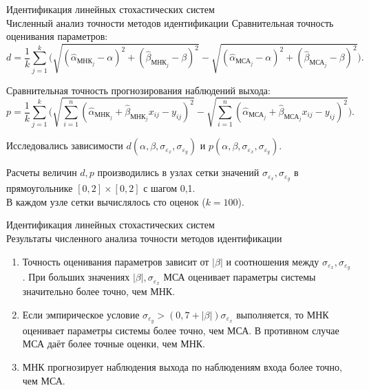 \documentclass[hyperref={pdftex,unicode}]{beamer}
\begin{document}
\begin{frame}{%
    Идентификация линейных стохастических систем \\
    \small{Численный анализ точности методов идентификации}
  }
  Сравнительная точность оценивания параметров:
  \small{
    \begin{equation*}
      d =
      \frac{1}{k} \sum_{j=1}^k
      \Bigg(
      \sqrt{(\hat{\alpha}_{\text{МНК}_j} - \alpha)^2 + (\hat{\beta}_{\text{МНК}_j} - \beta)^2} -
      \sqrt{(\hat{\alpha}_{\text{МСА}_j} - \alpha)^2 + (\hat{\beta}_{\text{МСА}_j} - \beta)^2}
      \Bigg).
    \end{equation*}
  }

  Сравнительная точность прогнозирования наблюдений выхода:
  \small{
    \begin{equation*}
      p =
      \frac{1}{k} \sum_{j=1}^k
      \Bigg(
      \sqrt{ \sum_{i=1}^n (\hat{\alpha}_{\text{МНК}_j} + \hat{\beta}_{\text{МНК}_j} x_{ij} - y_{ij})^2} -
      \sqrt{ \sum_{i=1}^n (\hat{\alpha}_{\text{МСА}_j} + \hat{\beta}_{\text{МСА}_j} x_{ij} - y_{ij})^2}
      \Bigg).
    \end{equation*}
  }

  Исследовались зависимости
  \( d(\alpha, \beta, \sigma_{\varepsilon_x}, \sigma_{\varepsilon_y}) \) и
  \( p(\alpha, \beta, \sigma_{\varepsilon_x}, \sigma_{\varepsilon_y}) \).

\bigskip
\scriptsize{%
  Расчеты величин \( d, p \) производились в узлах сетки значений
  \( \sigma_{\varepsilon_x}, \sigma_{\varepsilon_y} \) в прямоугольнике
  \( [0, 2] \times [0, 2] \) с шагом 0{,}1. \\
  В каждом узле сетки вычислялось сто оценок (\( k = 100 \)).
}
\end{frame}

\begin{frame}{Идентификация линейных стохастических систем \\
    \small{Результаты численного анализа точности методов идентификации}
  }
  \begin{enumerate}
\item Точность оценивания параметров зависит от \( |\beta| \)
  и соотношения между \( \sigma_{\varepsilon_x}, \sigma_{\varepsilon_y} \).
  При больших значениях \( |\beta|, \sigma_{\varepsilon_x} \)
  МСА оценивает параметры системы значительно более точно, чем МНК.
\item Если эмпирическое условие
  \( \sigma_{\varepsilon_y} > (0{,}7 + |\beta|) \sigma_{\varepsilon_x} \)
  выполняется, то МНК оценивает параметры системы более точно, чем МСА.
  В противном случае МСА даёт более точные оценки, чем МНК.
\item МНК прогнозирует наблюдения выхода по наблюдениям входа более точно, чем МСА.
\end{enumerate}
\end{frame}
\end{document}
